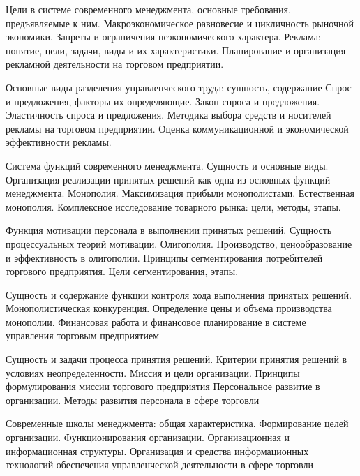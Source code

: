 \documentclass[
	11pt,
	a4paper,
	]
	{article}
\begin{document}
\bigskip

\noindent{} 
	{
		Цели в системе современного менеджмента, основные требования, предъявляемые к ним.
	}{
		Макроэкономическое равновесие и цикличность рыночной экономики. Запреты и ограничения неэкономического характера.
	}{
		Реклама: понятие, цели, задачи, виды и их характеристики. Планирование и организация рекламной деятельности на торговом предприятии.
	}

\bigskip

\noindent{} 
	{
		Основные виды разделения управленческого труда: сущность, содержание
	}{
		Спрос и предложения, факторы их определяющие. Закон спроса и предложения. Эластичность спроса и предложения.
	}{
		Методика выбора средств и носителей рекламы на торговом предприятии. Оценка коммуникационной и экономической эффективности рекламы.
	}

\bigskip

\noindent{} 
	{
		Система функций современного менеджмента. Сущность и основные виды. Организация реализации принятых решений как одна из основных функций менеджмента.
	}{
		Монополия. Максимизация прибыли монополистами. Естественная монополия.
	}{
		Комплексное исследование товарного рынка: цели, методы, этапы.
	}

\bigskip

\noindent{} 
	{
		Функция мотивации персонала в выполнении принятых решений. Сущность процессуальных теорий мотивации.
	}{
		Олигополия. Производство, ценообразование и эффективность в олигополии.
	}{
		Принципы сегментирования потребителей торгового предприятия. Цели сегментирования, этапы.
	}

\bigskip

\noindent{} 
	{
		Сущность и содержание функции контроля хода выполнения принятых решений.
	}{
		Монополистическая конкуренция. Определение цены и объема производства монополии.
	}{
		Финансовая работа и финансовое планирование в системе управления торговым предприятием
	}

\bigskip

\noindent{} 
	{
		Сущность и задачи процесса принятия решений. Критерии принятия решений в условиях неопределенности.
	}{
		Миссия и цели организации. Принципы формулирования миссии торгового предприятия
	}{
		Персональное развитие в организации. Методы развития персонала в сфере торговли
	}

\bigskip

\noindent{} 
	{
		Современные школы менеджмента: общая характеристика.
	}{
		Формирование целей организации. Функционирования организации. Организационная и информационная структуры.
	}{
		Организация и средства информационных технологий обеспечения управленческой деятельности в сфере торговли
	}
\end{document}
